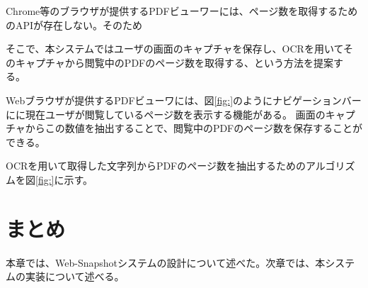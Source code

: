 Chrome等のブラウザが提供するPDFビューワーには、ページ数を取得するためのAPIが存在しない。そのため

そこで、本システムではユーザの画面のキャプチャを保存し、OCRを用いてそのキャプチャから閲覧中のPDFのページ数を取得する、という方法を提案する。

Webブラウザが提供するPDFビューワには、図\ref{fig:}のようにナビゲーションバーにに現在ユーザが閲覧しているページ数を表示する機能がある。
画面のキャプチャからこの数値を抽出することで、閲覧中のPDFのページ数を保存することができる。

OCRを用いて取得した文字列からPDFのページ数を抽出するためのアルゴリズムを図\ref{fig:}に示す。

\section{まとめ}
本章では、Web-Snapshotシステムの設計について述べた。次章では、本システムの実装について述べる。
